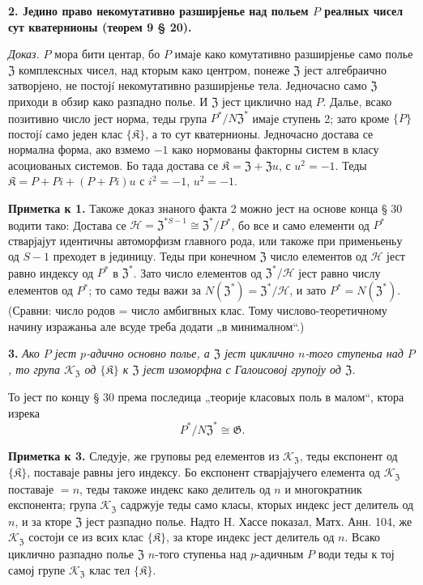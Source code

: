 \documentclass[11pt]{article}
\begin{document}
\noindent\textbf{2. Једино право некомутативно разширјенье над польем \(P\) реалных чисел сут кватернионы (теорем 9 § 20).}

\noindent\emph{Доказ.} \(P\) мора бити центар, бо \(P\) имаје како комутативно разширјенье само полье \(\mathfrak Z\) комплексных чисел, над кторым како центром, понеже \(\mathfrak Z\) јест алгебраично затворјено, не постојí некомутативно разширјенье тела. Једночасно само \(\mathfrak Z\) приходи в обзир како разпадно полье. И \(\mathfrak Z\) јест циклично над \(P\). Далье, всако позитивно число јест норма, теды група \(P^*/N\mathfrak Z^*\) имаје ступень 2; зато кроме \(\{P\}\) постојí само једен клас \(\{\mathfrak K\}\), а то сут кватернионы. Једночасно достава се нормална форма, ако взмемо \(-1\) како нормованы факторны систем в класу асоциованых системов. Бо тада достава се \(\mathfrak K=\mathfrak Z+\mathfrak Zu\), с \(u^2=-1\). Теды \(\mathfrak K=P+Pi+(P+Pi)u\) с \(i^2=-1\), \(u^2=-1\).

\noindent\textbf{Приметка к 1.} Такоже доказ знаного факта 2 можно јест на основе конца § 30 водити тако: Достава се \(\mathscr H=\mathfrak Z^{*S-1}\cong\mathfrak Z^*/P^*\), бо все и само елементи од \(P^*\) стварјајут идентичны автоморфизм главного рода, или такоже при применьеньу од \(S-1\) преходет в јединицу. Теды при конечном \(\mathfrak Z\) число елементов од \(\mathscr H\) јест равно индексу од \(P^*\) в \(\mathfrak Z^*\). Зато число елементов од \(\mathfrak Z^*/\mathscr H\) јест равно числу елементов од \(P^*\); то само теды важи за \(N(\mathfrak Z^*)=\mathfrak Z^*/\mathscr H\), и зато \(P^*=N(\mathfrak Z^*)\). (Сравни: число родов = число амбигвных клас. Тому числово-теоретичному начину изражаньа але всуде треба додати „в минималном“.)

\noindent\textbf{3.} \emph{Ако \(P\) јест \(p\)-адично основно полье, а \(\mathfrak Z\) јест циклично \(n\)-того ступеньа над \(P\), то група \(\mathscr K_{\mathfrak Z}\) од \(\{\mathfrak K\}\) к \(\mathfrak Z\) јест изоморфна с Галоисовој групоју од \(\mathfrak Z\).}

То јест по концу § 30 према последица „теорије класовых поль в малом“, ктора изрека
\[
P^*/N\mathfrak Z^*\cong\mathfrak G.
\]

\noindent\textbf{Приметка к 3.} Следује, же груповы ред елементов из \(\mathscr K_{\mathfrak Z}\), теды експонент од \(\{\mathfrak K\}\), поставаје равны јего индексу. Бо експонент стварјајучего елемента од \(\mathscr K_{\mathfrak Z}\) поставаје \(=n\), теды такоже индекс како делитель од \(n\) и многократник експонента; група \(\mathscr K_{\mathfrak Z}\) садржује теды само класы, кторых индекс јест делитель од \(n\), и за кторе \(\mathfrak Z\) јест разпадно полье. Надто H. Хассе показал, Матх. Анн. 104, же \(\mathscr K_{\mathfrak Z}\) состоји се из всих клас \(\{\mathfrak K\}\), за кторе индекс јест делитель од \(n\). Всако циклично разпадно полье \(\mathfrak Z\) \(n\)-того ступеньа над \(p\)-адичным \(P\) води теды к тој самој групе \(\mathscr K_{\mathfrak Z}\) клас тел \(\{\mathfrak K\}\).
\end{document}
